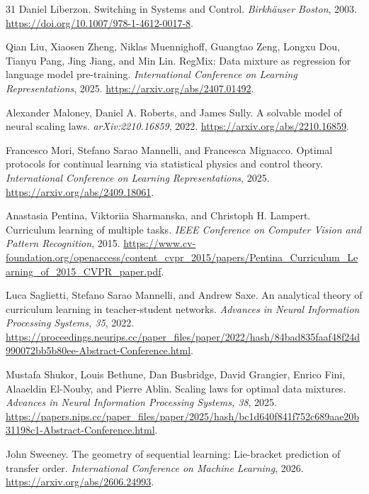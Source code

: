 \begin{thebibliography}{31}
Daniel Liberzon. Switching in Systems and Control. \emph{Birkh\"auser Boston}, 2003. \url{https://doi.org/10.1007/978-1-4612-0017-8}.

Qian Liu, Xiaosen Zheng, Niklas Muennighoff, Guangtao Zeng, Longxu Dou, Tianyu Pang, Jing Jiang, and Min Lin. RegMix: Data mixture as regression for language model pre-training. \emph{International Conference on Learning Representations}, 2025. \url{https://arxiv.org/abs/2407.01492}.

Alexander Maloney, Daniel A. Roberts, and James Sully. A solvable model of neural scaling laws. \emph{arXiv:2210.16859}, 2022. \url{https://arxiv.org/abs/2210.16859}.

Francesco Mori, Stefano Sarao Mannelli, and Francesca Mignacco. Optimal protocols for continual learning via statistical physics and control theory. \emph{International Conference on Learning Representations}, 2025. \url{https://arxiv.org/abs/2409.18061}.

Anastasia Pentina, Viktoriia Sharmanska, and Christoph H. Lampert. Curriculum learning of multiple tasks. \emph{IEEE Conference on Computer Vision and Pattern Recognition}, 2015. \url{https://www.cv-foundation.org/openaccess/content_cvpr_2015/papers/Pentina_Curriculum_Learning_of_2015_CVPR_paper.pdf}.

Luca Saglietti, Stefano Sarao Mannelli, and Andrew Saxe. An analytical theory of curriculum learning in teacher-student networks. \emph{Advances in Neural Information Processing Systems, 35}, 2022. \url{https://proceedings.neurips.cc/paper_files/paper/2022/hash/84bad835faaf48f24d990072bb5b80ee-Abstract-Conference.html}.

Mustafa Shukor, Louis Bethune, Dan Busbridge, David Grangier, Enrico Fini, Alaaeldin El-Nouby, and Pierre Ablin. Scaling laws for optimal data mixtures. \emph{Advances in Neural Information Processing Systems, 38}, 2025. \url{https://papers.nips.cc/paper_files/paper/2025/hash/bc1d640f841f752c689aae20b31198c1-Abstract-Conference.html}.

John Sweeney. The geometry of sequential learning: Lie-bracket prediction of transfer order. \emph{International Conference on Machine Learning}, 2026. \url{https://arxiv.org/abs/2606.24993}.


\end{thebibliography}
